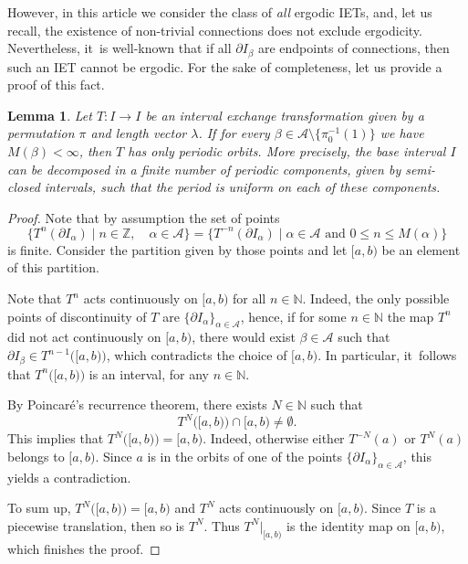 \documentclass[JEP,XML,SOM,Unicode,NoEqCountersInSection,NoFloatCountersInSection,published]{cedram}
\theoremstyle{plain}
\newtheorem{lemma}[theorem]{Lemma}
\theoremstyle{definition}
\newcommand{\A}{\mathcal{A}}
\newcommand{\Z}{\mathbb{Z}}
\newcommand{\N}{\mathbb{N}}
\begin{document}
{However, in this article we consider the class of \emph{all} ergodic IETs, and, let us recall, the existence of non-trivial connections does not exclude ergodicity. Nevertheless, it~is well-known that if all $\partial I_{\beta}$ are endpoints of connections, then such an IET cannot be ergodic. For the sake of completeness, let us provide a proof of this fact.

\begin{lemma}\label{lem: notallconnections}
Let $T:I\to I$ be an interval exchange transformation given by a permutation $\pi$ and length vector $\lambda$. If for every $\beta\in \A\setminus \{\pi_0^{-1}(1)\}$ we have $M(\beta)<\infty$, then $T$ has only periodic orbits. {More precisely, the base interval $I$ can be decomposed in a finite number of periodic components, given by semi-closed intervals, such that the period is uniform on each of these components.}
\end{lemma}

\begin{proof}
Note that by assumption the set of points
\[
\{T^{n}(\partial I_{\alpha})\mid n\in\Z,\quad\alpha\in \A\}=\{T^{-n}(\partial I_{\alpha})\mid \alpha\in\A\text{ and } 0\le n\le M(\alpha)\}
\]
is finite. Consider the partition given by those points and let $[a,b)$ be an element of this partition.

Note that $T^n$ acts continuously on $[a,b)$ for all $n\in\N$. Indeed, the only possible points of discontinuity of $T$ are $\{\partial I_{\alpha}\}_{\alpha\in\A}$, hence, if for some $n\in\N$ the map $T^n$ did not act continuously on $[a,b)$, there would exist $\beta\in\mathcal A$ such that $\partial I_{\beta}\in T^{n-1}\big([a,b)\big)$, which contradicts the choice of $[a,b)$. In particular, it~follows that $T^n\big([a,b)\big)$ is an interval, for any $n \in \N$.

By Poincaré's recurrence theorem, there exists $N\in\N$ such that
\[
T^{N}\big([a,b)\big)\cap [a,b)\neq \emptyset.
\]
This implies that $T^{N}\big([a,b)\big)=[a,b)$. Indeed, otherwise either $T^{-N}(a)$ or $T^{N}(a)$ belongs to $[a,b)$. Since $a$ is in the orbits of one of the points $\{\partial I_{\alpha}\}_{\alpha\in\A}$, this yields a contradiction.

To sum up, $T^{N}\big([a,b)\big)=[a,b)$ and $T^N$ acts continuously on $[a,b)$. Since $T$ is a piecewise translation, then so is $T^N$. Thus $T^N|_{[a,b)}$ is the identity map on $[a,b)$, which finishes the proof.
\end{proof}

}
\end{document}
